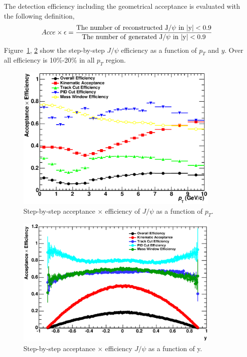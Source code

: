\label{sec_4_correction}
The detection efficiency including the geometrical acceptance is evaluated with the following definition, 
\begin{equation}
  Acce\times \epsilon = \frac{\rm{The~ number~ of~ reconstructed}~ J/\psi ~\rm{in}~ |y| < 0.9}{\rm{The~number~of~generated}~J/\psi ~in~ |y| < 0.9}
\end{equation}
Figure~\ref{fig_4_jpsieff_pt}, \ref{fig_4_jpsieff_y} show the step-by-step $J/\psi$ efficiency as a function of $p_{T}$ and $y$.
Over all efficiency is 10\%-20\% in all $p_{T}$ region. 
\begin{figure}[!h]
  \centering
  \includegraphics[width=10cm]{chap4/figure/Correction/JpsiEff_pt_stepbystep.eps}
  \caption{Step-by-step acceptance $\times$ efficiency of $J/\psi$ as a function of $p_{T}$.}
  \label{fig_4_jpsieff_pt}
\end{figure}

\begin{figure}[!h]
  \centering
  \includegraphics[width=10cm]{chap4/figure/Correction/JpsiEff_y_stepbystep.eps}
  \caption{Step-by-step acceptance $\times$ efficiency $J/\psi$ as a function of y.}
  \label{fig_4_jpsieff_y}
\end{figure}

